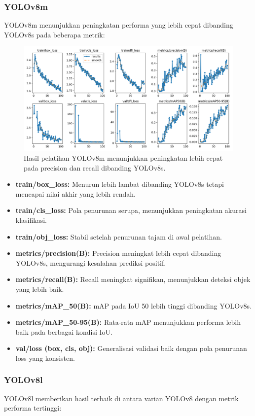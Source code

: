 \documentclass[12pt,a4paper]{article}
\begin{document}
\subsubsection{YOLOv8m}
YOLOv8m menunjukkan peningkatan performa yang lebih cepat dibanding YOLOv8s pada beberapa metrik:

\begin{figure}[H]
    \centering
    \includegraphics[width=0.6\linewidth]{assets/yolov8m_results.png}
    \caption{Hasil pelatihan YOLOv8m menunjukkan peningkatan lebih cepat pada precision dan recall dibanding YOLOv8s.}
    \label{fig:yolov8m_results}
\end{figure}

\begin{itemize}
    \item \textbf{train/box\_loss:} Menurun lebih lambat dibanding YOLOv8s tetapi mencapai nilai akhir yang lebih rendah.
    \item \textbf{train/cls\_loss:} Pola penurunan serupa, menunjukkan peningkatan akurasi klasifikasi.
    \item \textbf{train/obj\_loss:} Stabil setelah penurunan tajam di awal pelatihan.
    \item \textbf{metrics/precision(B):} Precision meningkat lebih cepat dibanding YOLOv8s, mengurangi kesalahan prediksi positif.
    \item \textbf{metrics/recall(B):} Recall meningkat signifikan, menunjukkan deteksi objek yang lebih baik.
    \item \textbf{metrics/mAP\_50(B):} mAP pada IoU 50 lebih tinggi dibanding YOLOv8s.
    \item \textbf{metrics/mAP\_50-95(B):} Rata-rata mAP menunjukkan performa lebih baik pada berbagai kondisi IoU.
    \item \textbf{val/loss (box, cls, obj):} Generalisasi validasi baik dengan pola penurunan loss yang konsisten.
\end{itemize}

\subsubsection{YOLOv8l}
YOLOv8l memberikan hasil terbaik di antara varian YOLOv8 dengan metrik performa tertinggi:
\end{document}
